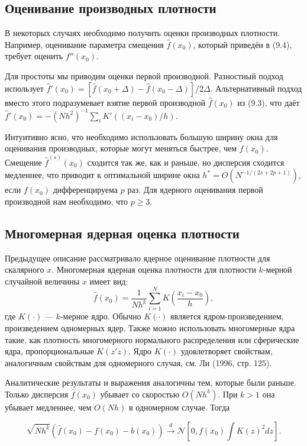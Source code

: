\subsection{Оценивание производных плотности}

В некоторых случаях необходимо получить оценки производных плотности. Например, оценивание параметра смещения $\hat{f}(x_0)$, который приведён в (9.4), требует оценить $f''(x_0)$.

Для простоты мы приводим оценки первой производной. Разностный подход использует $\hat{f}'(x_0) = [\hat{f}(x_0 + \Delta) - \hat{f}(x_0 - \Delta)]/2\Delta$. Альтернативный подход вместо этого подразумевает взятие первой производной $\hat{f}(x_0)$ из (9.3), что даёт $\hat{f}'(x_0) = - (Nh^2)^{-1} \sum_i K'((x_i - x_0)/h)$.

Интуитивно ясно, что необходимо использовать большую ширину окна для оценивания производных, которые могут
меняться быстрее, чем $f(x_0)$. Смещение $\hat{f}^{(s)}(x_0)$ сходится так же, как и раньше, но дисперсия сходится медленнее, что приводит к оптимальной ширине окна $h^* = O(N^{-1/(2s+2p+1)})$, если $f(x_0)$ дифференцируема $p$ раз. Для ядерного оценивания первой производной нам необходимо, что $p \geq 3$.

\subsection{Многомерная ядерная оценка плотности}

Предыдущее описание рассматривало ядерное оценивание плотности для скалярного $x$. Многомерная ядерная оценка плотности для плотности $k$-мерной случайной величины $x$ имеет вид: 
\[
\hat{f}(x_0) = \frac{1}{Nh^k} \sum_{i=1}^N K\left( \frac{x_i - x_0}{h} \right),
\]
где $K(\cdot)$ --- $k$-мерное ядро. Обычно $K(\cdot)$ является ядром-произведением, произведением одномерных ядер. Также можно использовать многомерные ядра такие, как плотность многомерного нормального распределения или сферические ядра, пропорциональные $K(z'z)$. Ядро $K(\cdot)$ удовлетворяет свойствам, аналогичным свойствам для одномерного случая, см. Ли (1996, стр. 125).

Аналитические результаты и выражения аналогичны тем, которые были раньше. Только дисперсия $\hat{f}(x_0)$ убывает со скоростью $O(Nh^k)$. При $k > 1$ она убывает медленнее, чем $O(Nh)$ в одномерном случае. Тогда

\[
\sqrt{Nh^k}(\hat{f}(x_0) - f(x_0) - b(x_0)) \stackrel{d}{\rightarrow} \mathcal{N}\left[ 0, f(x_0)\int K(z)^2dz \right].
\] 

